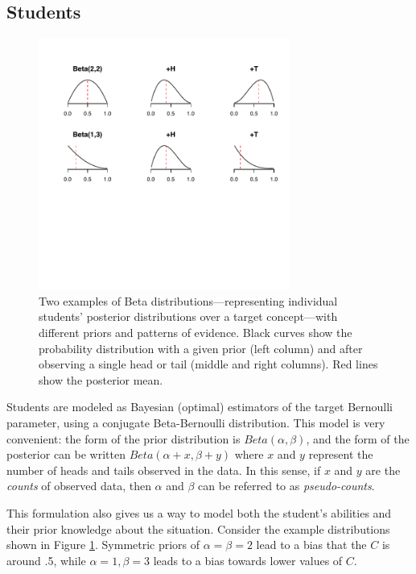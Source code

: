 \documentclass[10pt,letterpaper]{article}
\begin{document}
\subsection{Students}

\begin{figure}[t]
\begin{center}
\includegraphics[width=3.25in]{figures/students2.pdf}
\end{center}
\caption{\label{fig:students} Two examples of Beta distributions---representing individual students' posterior distributions over a target concept---with different priors and patterns of evidence. Black curves show the probability distribution with a given prior (left column) and after observing a single head or tail (middle and right columns). Red lines show the posterior mean.}
\end{figure}

Students are modeled as Bayesian (optimal) estimators of the target Bernoulli parameter, using a conjugate Beta-Bernoulli distribution. This model is very convenient: the form of the prior distribution is $Beta(\alpha,\beta)$, and the form of the posterior can be written $Beta(\alpha+x,\beta+y)$ where $x$ and $y$ represent the number of heads and tails observed in the data. In this sense, if $x$ and $y$ are the \emph{counts} of observed data, then $\alpha$ and $\beta$ can be referred to as \emph{pseudo-counts}.

This formulation also gives us a way to model both the student's abilities and their prior knowledge about the situation. Consider the example distributions shown in Figure \ref{fig:students}. Symmetric priors of $\alpha=\beta=2$ lead to a bias that the $C$ is around .5, while $\alpha=1, \beta=3$ leads to a bias towards lower values of $C$. 
\end{document}
